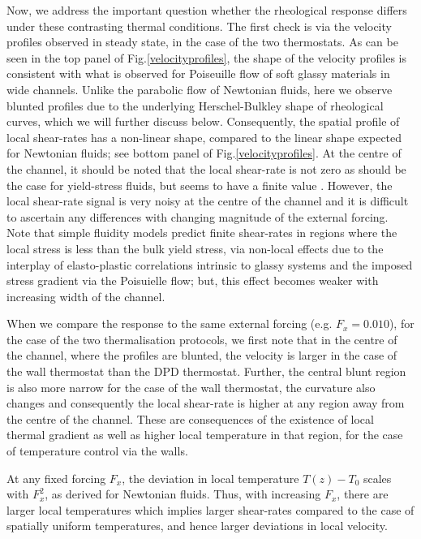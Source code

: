 Now, we address the important question whether the rheological response differs under these contrasting thermal conditions. The first check is via the velocity profiles observed in steady state, in the case of the two thermostats. As can be seen in the top panel of Fig.\ref{velocityprofiles}, the shape of the velocity profiles is consistent with what is observed for Poiseuille flow of soft glassy materials in wide channels. Unlike the parabolic flow of Newtonian fluids, here we observe blunted profiles due to the underlying Herschel-Bulkley shape of rheological curves, which we will further discuss below.  Consequently, the spatial profile of local shear-rates has a non-linear shape, compared to the linear shape expected for Newtonian fluids; see bottom panel of Fig.\ref{velocityprofiles}. At the centre of the channel, it should be noted that the local shear-rate is not zero as should be the case for yield-stress fluids, but seems to have a finite value \cite{mansard2013molecular}. However, the local shear-rate signal is very noisy at the centre of the channel and it is difficult to ascertain any differences with changing magnitude of the external forcing. Note that simple fluidity models \cite{goyon2008spatial, chaudhuri2012dynamical} predict finite shear-rates in regions where the local stress is less than the bulk yield stress, via non-local effects \cite{bocquet2009kinetic} due to the interplay of elasto-plastic correlations intrinsic to glassy systems and the imposed stress gradient via the Poisuielle flow; but, this effect becomes weaker with increasing width of the channel.

When we compare the response to the same external forcing (e.g. $F_x=0.010$), for the case of the two thermalisation protocols, we first note that in the centre of the channel, where the profiles are blunted, the velocity is larger in the case of the wall thermostat than the DPD thermostat. Further, the central blunt region is also more narrow for the case of the wall thermostat, the curvature also changes and consequently the local shear-rate is higher at any region away from the centre of the channel. These are consequences of the existence of local thermal gradient as well as higher local temperature in that region, for the case of temperature control via the walls. 

At any fixed forcing $F_x$, the deviation in local temperature $T(z) - T_0$ scales with $F_x^2$, as derived for Newtonian fluids. Thus, with increasing $F_x$, there are larger local temperatures which implies larger shear-rates compared to the case of spatially uniform temperatures, and hence larger deviations in local velocity.

